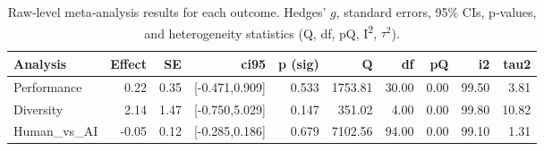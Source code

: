 \begin{table}[ht]
\centering
\begin{tabular}{lrrrrrrrrr}
  \toprule
Analysis & Effect & SE & ci95 & p (sig) & Q & df & pQ & i2 & tau2 \\ 
  \midrule
Performance & 0.22 & 0.35 & [-0.471,0.909] & 0.533 & 1753.81 & 30.00 & 0.00 & 99.50 & 3.81 \\ 
  Diversity & 2.14 & 1.47 & [-0.750,5.029] & 0.147 & 351.02 & 4.00 & 0.00 & 99.80 & 10.82 \\ 
  Human_vs_AI & -0.05 & 0.12 & [-0.285,0.186] & 0.679 & 7102.56 & 94.00 & 0.00 & 99.10 & 1.31 \\ 
   \bottomrule
\end{tabular}
\caption{Raw‐level meta‐analysis results for each outcome. Hedges’ $g$, standard errors, 95\% CIs, p‐values, and heterogeneity statistics (Q, df, pQ, I\textsuperscript{2}, $\tau^2$).} 
\label{tab:meta_raw}
\end{table}
